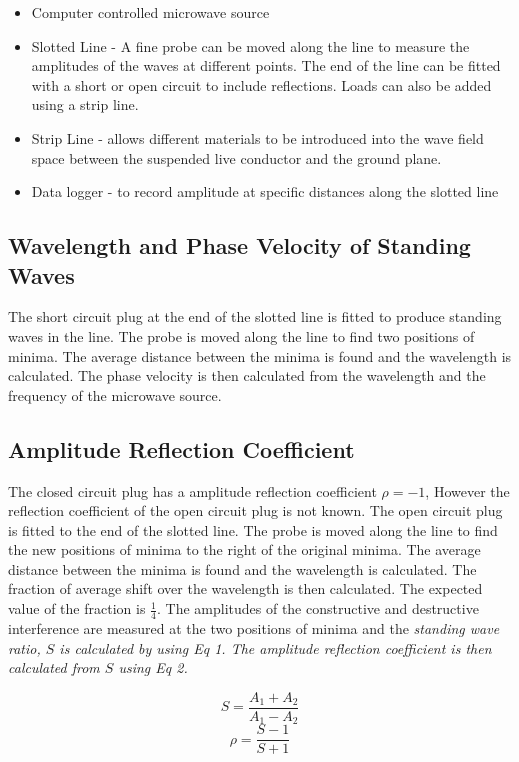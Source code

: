 \documentclass[12pt]{article}
\begin{document}
\begin{itemize}
    \item Computer controlled microwave source
    \item Slotted Line - A fine probe can be moved along the line to measure the amplitudes of the waves at different points. The end of the line can be fitted with a short or open circuit to include reflections. Loads can also be added using a strip line.
    \item Strip Line - allows different materials to be introduced into the wave field space between the suspended live conductor and the ground plane.
    \item Data logger - to record amplitude at specific distances along the slotted line
\end{itemize}

\subsection{Wavelength and Phase Velocity of Standing Waves}

The short circuit plug at the end of the slotted line is fitted to produce standing waves in the line. The probe is moved along the line to find two positions of minima. The average distance between the minima is found and the wavelength is calculated. The phase velocity is then calculated from the wavelength and the frequency of the microwave source.

\subsection{Amplitude Reflection Coefficient}

The closed circuit plug has a amplitude reflection coefficient $\rho = -1$, However the reflection coefficient of the open circuit plug is not known.
The open circuit plug is fitted to the end of the slotted line. The probe is moved along the line to find the new positions of minima to the right of the original minima.
The average distance between the minima is found and the wavelength is calculated. The fraction of average shift over the wavelength is then calculated. The expected value of the fraction is $\frac{1}{4}$.
The amplitudes of the constructive and destructive interference are measured at the two positions of minima and the \it{standing wave ratio, $S$} is calculated by using Eq 1.
The amplitude reflection coefficient is then calculated from $S$ using Eq 2.

\begin{equation}
    S = \frac{A_1 + A_2}{A_1 - A_2}
\end{equation}
\begin{equation}
    \rho = \frac{S-1}{S+1}
\end{equation}
\end{document}
